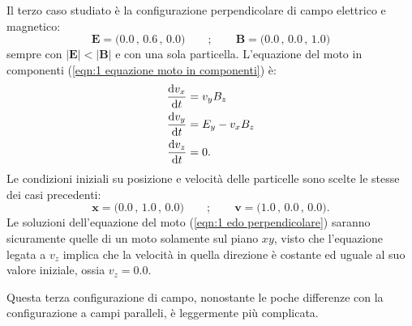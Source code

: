 \documentclass[10pt,a4paper]{article}
\begin{document}
Il terzo caso studiato è la configurazione perpendicolare di campo elettrico e magnetico:
\begin{equation}
    \mathbf{E} = \big( 0.0\, , \, 0.6\, , \, 0.0 \big) \qquad ; \qquad \mathbf{B} = \big( 0.0\, , \, 0.0\, , \, 1.0 \big)
\end{equation}
sempre con $|\mathbf{E}| < |\mathbf{B}|$ e con una sola particella. L'equazione del moto in componenti (\ref{eqn:1 equazione moto in componenti}) è:
\begin{align}
    \dv{v_{x}}{t} &= v_{y}B_{z} \notag \\
    \dv{v_{y}}{t} &= E_y - v_{x}B_{z} \label{eqn:1 edo perpendicolare} \\
    \dv{v_{z}}{t} &= 0. \notag
\end{align}
Le condizioni iniziali su posizione e velocità delle particelle sono scelte le stesse dei casi precedenti:
\begin{equation*}
    \mathbf{x} = \big( 0.0\, , \, 1.0\, , \, 0.0 \big) \qquad ; \qquad \mathbf{v} = \big( 1.0\, , \, 0.0\, , \, 0.0 \big).
\end{equation*}
Le soluzioni dell'equazione del moto (\ref{eqn:1 edo perpendicolare}) saranno sicuramente quelle di un moto solamente sul piano $xy$, visto che l'equazione legata a $v_z$ implica che la velocità in quella direzione è costante ed uguale al suo valore iniziale, ossia $v_z = 0.0$.

Questa terza configurazione di campo, nonostante le poche differenze con la configurazione a campi paralleli, è leggermente più complicata.
\end{document}
